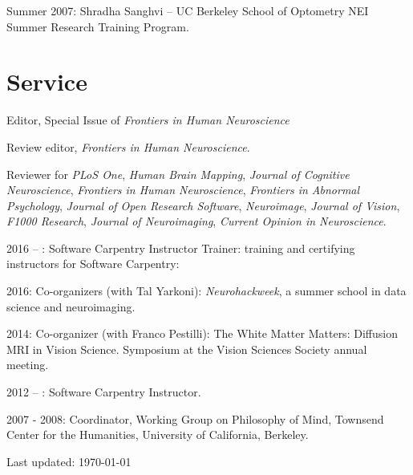 \documentclass[11pt,fullpage]{article}
\begin{document}
Summer 2007: Shradha Sanghvi -- UC Berkeley School of Optometry NEI Summer Research Training Program.


\section*{Service}

Editor, Special Issue of \emph{Frontiers in Human Neuroscience}

Review editor, \emph{Frontiers in Human Neuroscience}.

Reviewer for \emph{PLoS One}, \emph{Human Brain Mapping}, \emph{Journal of Cognitive Neuroscience}, \emph{Frontiers in Human Neuroscience}, \emph{Frontiers in Abnormal Psychology}, \emph{Journal of Open Research Software}, \emph{Neuroimage}, \emph{Journal of Vision}, \emph{F1000 Research}, \emph{Journal of Neuroimaging}, \emph{Current Opinion in Neuroscience}.

\vspace{1cm}

2016 -- : Software Carpentry Instructor Trainer: training and certifying instructors for Software Carpentry:

2016: Co-organizers (with Tal Yarkoni): \emph{Neurohackweek}, a summer school in data science and neuroimaging.

2014: Co-organizer (with Franco Pestilli): The White Matter Matters: Diffusion MRI in Vision Science. Symposium at the Vision Sciences Society annual meeting.

2012 -- : Software Carpentry Instructor.

2007 - 2008: Coordinator, Working Group on Philosophy of Mind, Townsend Center for the Humanities, University of California, Berkeley.

\bigskip
\begin{center}
  \begin{footnotesize}
    Last updated: \today
  \end{footnotesize}
\end{center}

\end{document}
